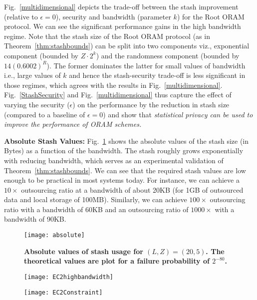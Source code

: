 \documentclass[USenglish,oneside,twocolumn]{article}
\newcommand{\ourprotocol}{Root ORAM}
\begin{document}
Fig.~\ref{multidimensional} depicts the trade-off between the stash improvement (relative to $\epsilon = 0$), security and bandwidth (parameter $k$) for the \ourprotocol{} protocol. We can see the significant performance gains in the high bandwidth regime. Note that the stash size of the \ourprotocol{} protocol (as in Theorem~\ref{thm:stashbounds}) can be split into two components viz., exponential component (bounded by $Z \cdot 2^k$) and the randomness component (bounded by $14 (0.6002)^R$). The former dominates the latter for small values of bandwidth i.e., large values of $k$ and hence the stash-security trade-off is less significant in those regimes, which agrees with the results in Fig.~\ref{multidimensional}. Fig.~\ref{StashSecurity} and Fig.~\ref{multidimensional} thus capture the effect of varying the security ($\epsilon$) on the performance by the reduction in stash size (compared to a baseline of $\epsilon = 0$) and show that \textit{statistical privacy can be used to improve the performance of ORAM schemes.}


\textbf{Absolute Stash Values: } Fig.~\ref{fig:stash} shows the absolute values of the stash size (in Bytes) as a function of the bandwidth. The stash roughly grows exponentially with reducing bandwidth, which serves as an experimental validation of Theorem~\ref{thm:stashbounds}. We can see that the required stash values are low enough to be practical in most systems today. For instance, we can achieve a $10\times$ outsourcing ratio at a bandwidth of about 20KB (for 1GB of outsourced data and local storage of 100MB). Similarly, we can achieve $100\times$ outsourcing ratio with a bandwidth of 60KB and an outsourcing ratio of $1000\times$ with a bandwidth of 90KB.


\begin{figure}[!tp]
\centering
\texttt{[image: absolute]}
\caption{\textbf{Absolute values of stash usage for $(L,Z) = (20, 5)$. The theoretical values are plot for a failure probability of $2^{-80}$.}}
\label{fig:stash}
\end{figure}


\begin{figure*}[!htp]
\centering
\begin{subfigure}[b]{.47\textwidth}
\centering
\texttt{[image: EC2highbandwidth]}
\caption{}\label{ec2latency}
\end{subfigure}\qquad
\begin{subfigure}[b]{.47\textwidth}
\centering
\texttt{[image: EC2Constraint]}
\caption{}\label{ec2constraint}
\end{subfigure}
\vspace{-10pt}
\caption{\textbf{Real-world implementations over Amazon EC2. Fig.~\ref{ec2latency} shows the \ourprotocol{} latency as a function of the bandwidth for $(L, Z) = (20, 5)$ and different block sizes viz., $1$ KB, $4$ KB and $16$ KB. Fig.~\ref{ec2constraint} shows the latency as a function of the constrained/limited application bandwidth for $4$ KB block sizes and $(L, Z) = (20, 5)$. Note the significant difference between the access latency across different $k$ values for constrained bandwidth applications.}}\label{fig:EC2}
\end{figure*}
\end{document}
